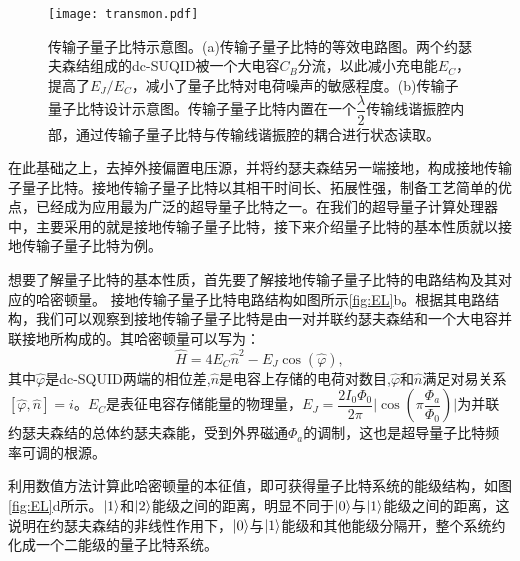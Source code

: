 \begin{figure}[h]
	\centering
	\texttt{[image: transmon.pdf]}
	\caption{传输子量子比特示意图\cite{koch2007charge}。(a)传输子量子比特的等效电路图。两个约瑟夫森结组成的dc-SUQID被一个大电容$ C_{B}$分流，以此减小充电能$ E_{C}$，提高了$ E_{J}/E_{C}$，减小了量子比特对电荷噪声的敏感程度。(b)传输子量子比特设计示意图。传输子量子比特内置在一个$ \dfrac{\lambda}{2}$传输线谐振腔内部，通过传输子量子比特与传输线谐振腔的耦合进行状态读取。}
	\label{fig:transmon}
\end{figure}

在此基础之上，去掉外接偏置电压源，并将约瑟夫森结另一端接地，构成接地传输子量子比特\cite{barends2013coherent}。接地传输子量子比特以其相干时间长、拓展性强，制备工艺简单的优点，已经成为应用最为广泛的超导量子比特之一。在我们的超导量子计算处理器中，主要采用的就是接地传输子量子比特，接下来介绍量子比特的基本性质就以接地传输子量子比特为例。

想要了解量子比特的基本性质，首先要了解接地传输子量子比特的电路结构及其对应的哈密顿量。
接地传输子量子比特电路结构如图所示\ref{fig:EL}b。根据其电路结构，我们可以观察到接地传输子量子比特是由一对并联约瑟夫森结和一个大电容并联接地所构成的。其哈密顿量可以写为：
\begin{equation}\label{XmonHamilton}
	\hat{H} =  4E_{C}\hat{n}^{2}-E_{J}\cos\left(\hat{\varphi}\right),
\end{equation}
其中$\hat{\varphi}$是dc-SQUID两端的相位差,$\hat{n}$是电容上存储的电荷对数目,$ \hat{\varphi}$和$ \hat{n}$满足对易关系$ [\hat{\varphi},\hat{n}]={i}$。$E_{C}$是表征电容存储能量的物理量，$ E_{J}=\dfrac{2I_{0}\Phi_{0}}{2\pi}\lvert \cos(\pi \dfrac{\Phi_{a}}{\Phi_{0}}) \rvert$为并联约瑟夫森结的总体约瑟夫森能，受到外界磁通$ \Phi_{a} $的调制，这也是超导量子比特频率可调的根源。

利用数值方法计算此哈密顿量的本征值，即可获得量子比特系统的能级结构，如图\ref{fig:EL}d所示。$\left|1\right>$和$\left|2\right>$能级之间的距离，明显不同于$\left|0\right>$与$\left|1\right>$能级之间的距离，这说明在约瑟夫森结的非线性作用下，$\left|0\right>$与$\left|1\right>$能级和其他能级分隔开，整个系统约化成一个二能级的量子比特系统。

